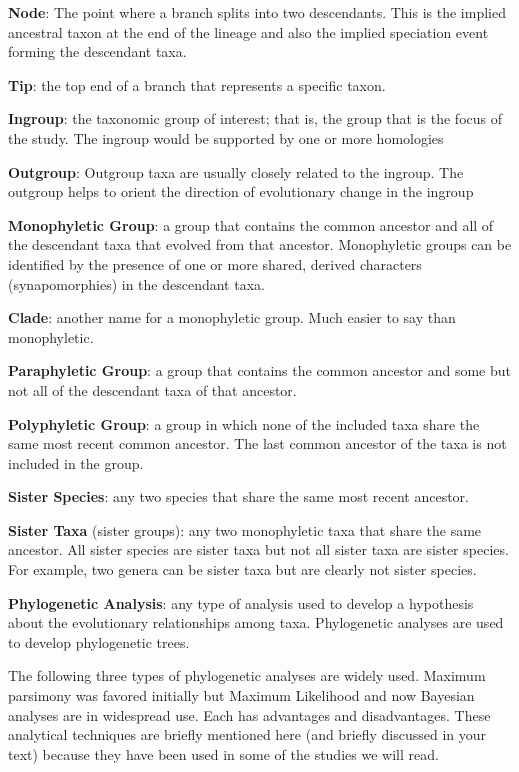 \documentclass[letterpaper]{tufte-handout}
\begin{document}
\textbf{Node}: The point where a branch splits into two descendants.  This is the implied ancestral taxon at the end of the lineage and also the implied speciation event forming the descendant taxa.

\textbf{Tip}: the top end of a branch that represents a specific taxon.

\textbf{Ingroup}: the taxonomic group of interest; that is, the group that is the focus of the study. The ingroup would be supported by one or more homologies

\textbf{Outgroup}: Outgroup taxa are usually closely related to the ingroup.  The outgroup helps to orient the direction of evolutionary change in the ingroup

\textbf{Monophyletic Group}: a group that contains the common ancestor and all of the descendant taxa that evolved from that ancestor. Monophyletic groups can be identified by the presence of one or more shared, derived characters (synapomorphies) in the descendant taxa.

\textbf{Clade}: another name for a monophyletic group.  Much easier to say than monophyletic.

\textbf{Paraphyletic Group}: a group that contains the common ancestor and some but not all of the descendant taxa of that ancestor. 

\textbf{Polyphyletic Group}: a group in which none of the included taxa share the same most recent common ancestor.  The last common ancestor of the taxa is not included in the group.

\textbf{Sister Species}: any two species that share the same most recent ancestor. 

\textbf{Sister Taxa} (sister groups): any two monophyletic taxa that share the same ancestor. All sister species are sister taxa but not all sister taxa are sister species. For example, two genera can be sister taxa but are clearly not sister species.

\textbf{Phylogenetic Analysis}: any type of analysis used to develop a hypothesis about the evolutionary relationships among taxa.  Phylogenetic analyses are used to develop phylogenetic trees. 

The following three types of phylogenetic analyses are widely used. Maximum parsimony was favored initially but Maximum Likelihood and now Bayesian analyses are in widespread use. Each has advantages and disadvantages. These analytical techniques are briefly mentioned here (and briefly discussed in your text) because they have been used in some of the studies we will read.
\end{document}
